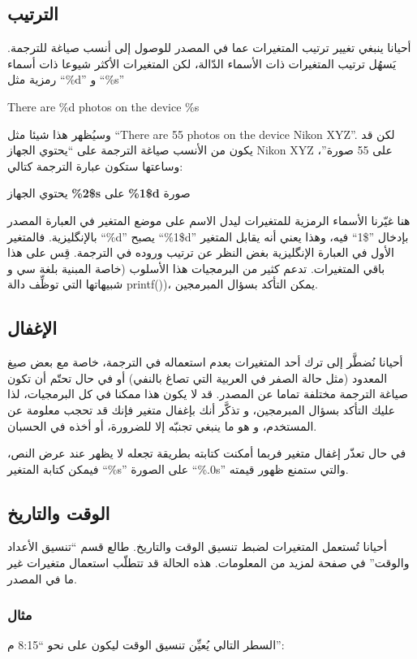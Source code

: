 \subsection{الترتيب}
أحيانا ينبغي تغيير ترتيب المتغيرات عما في المصدر للوصول إلى أنسب صياغة
للترجمة. يَسهُل ترتيب المتغيرات ذات الأسماء الدّالة، لكن المتغيرات
الأكثر شيوعا ذات أسماء رمزية مثل ‪“\%d”‬ و ‪“\%s”‬

There are \%d photos on the device \%s

وسيُظهر هذا شيئا مثل “There are 55 photos on the device Nikon XYZ”. لكن
قد يكون من الأنسب صياغة الترجمة على “يحتوي الجهاز Nikon XYZ على 55
صورة”، وساعتها ستكون عبارة الترجمة كتالي:

يحتوي الجهاز ‪{\bf \%2\$s}‬ على ‪{\bf \%1\$d}‬ صورة

هنا غيّرنا الأسماء الرمزية للمتغيرات ليدل الاسم على موضع المتغير في
العبارة المصدر بالإنگليزية. فالمتغير ‪“\%d”‬ يصبح ‪“\%1\$d”‬ بإدخال
”\$1“ فيه، وهذا يعني أنه يقابل المتغير الأول في العبارة الإنگليزية بغض
النظر عن ترتيب وروده في الترجمة. قِس على هذا باقي المتغيرات. تدعم كثير
من البرمجيات هذا الأسلوب (خاصة المبنية بلغة سي و شبيهاتها التي توظِّف
دالة ‪printf()‬)، يمكن التأكد بسؤال المبرمجين.

\subsection{الإغفال}
أحيانا نُضطَّر إلى ترك أحد المتغيرات بعدم استعماله في الترجمة، خاصة مع
بعض صيغ المعدود (مثل حالة الصفر في العربية التي تصاغ بالنفي) أو في حال
تحتّم أن تكون صياغة الترجمة مختلفة تماما عن المصدر. قد لا يكون هذا
ممكنا في كل البرمجيات، لذا عليك التأكد بسؤال المبرمجين، و تذكَّر أنك
بإغفال متغير فإنك قد تحجب معلومة عن المستخدم، و هو ما ينبغي تجنبّه إلا
للضرورة، أو أخذه في الحسبان.

في حال تعذّر إغفال متغير فربما أمكنت كتابته بطريقة تجعله لا يظهر عند عرض
النص، فيمكن كتابة المتغير ‪“\%s”‬ على الصورة ‪“\%.0s”‬ والتي ستمنع ظهور
قيمته.

\subsection{الوقت والتاريخ}
أحيانا تُستعمل المتغيرات لضبط
تنسيق الوقت والتاريخ. طالع قسم “تنسيق الأعداد والوقت” في صفحة
 لمزيد من المعلومات. هذه الحالة قد تتطلّب
استعمال متغيرات غير ما في المصدر.

\subsubsection{مثال}
السطر التالي يُعيِّن تنسيق الوقت ليكون على نحو “8:15 م”:

